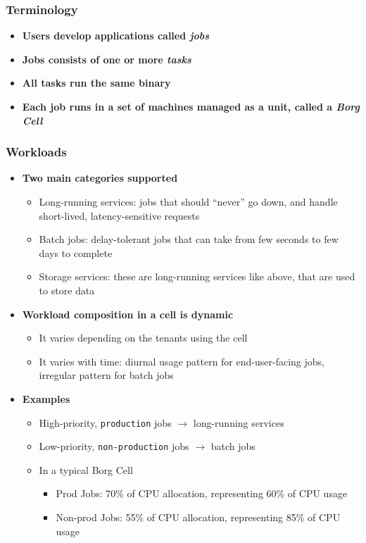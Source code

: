 \begin{frame}
\frametitle{Terminology}
\begin{itemize}
	\item {\bf Users develop applications called {\it jobs}}
	
\vspace{20pt}

	\item {\bf Jobs consists of one or more {\it tasks}}

\vspace{20pt}

	\item {\bf All tasks run the same binary}

\vspace{20pt}

	\item {\bf Each job runs in a set of machines managed as a unit, called a {\it Borg Cell}}
\end{itemize}
\end{frame}

\begin{frame}
\frametitle{Workloads}
\begin{itemize}
	\item {\bf Two main categories supported}
	\begin{itemize}
		\item Long-running services: jobs that should ``never'' go down, and handle short-lived, latency-sensitive requests
		\item Batch jobs: delay-tolerant jobs that can take from few seconds to few days to complete
		\item Storage services: these are long-running services like above, that are used to store data
	\end{itemize}
	\item {\bf Workload composition in a cell is dynamic}
	\begin{itemize}
		\item It varies depending on the tenants using the cell
		\item It varies with time: diurnal usage pattern for end-user-facing jobs, irregular pattern for batch jobs
	\end{itemize}
	\item {\bf Examples}
	\begin{itemize}
		\item High-priority, \texttt{production} jobs $\to$ long-running services
		\item Low-priority, \texttt{non-production} jobs $\to$ batch jobs
		\item In a typical Borg Cell
		\begin{itemize}
			\item Prod Jobs: 70\% of CPU allocation, representing 60\% of CPU usage
			\item Non-prod Jobs: 55\% of CPU allocation, representing 85\% of CPU usage
		\end{itemize}
	\end{itemize}
\end{itemize}
\end{frame}


